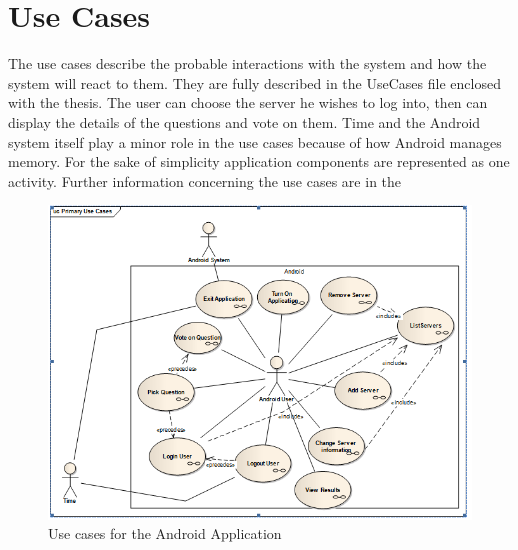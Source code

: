 \documentclass[11pt,twoside,a4paper]{book}
\begin{document}
\section{Use Cases}
The use cases describe the probable interactions with the system and how the system will react to them. They are fully described in the UseCases file enclosed with the thesis. The user can choose the server he wishes to log into, then can display the details of the questions and vote on them. Time and the Android system itself play a minor role in the use cases because of how Android manages memory. For the sake of simplicity application components are represented as one activity. Further information concerning the use cases are in the 



\begin{figure}[h]
\begin{center}
\includegraphics[scale=1]{figures/AndroidUCs.PNG} 
\caption{Use cases for the Android Application}
\label{fig:Use Cases}
\end{center}
\end{figure}
\end{document}
